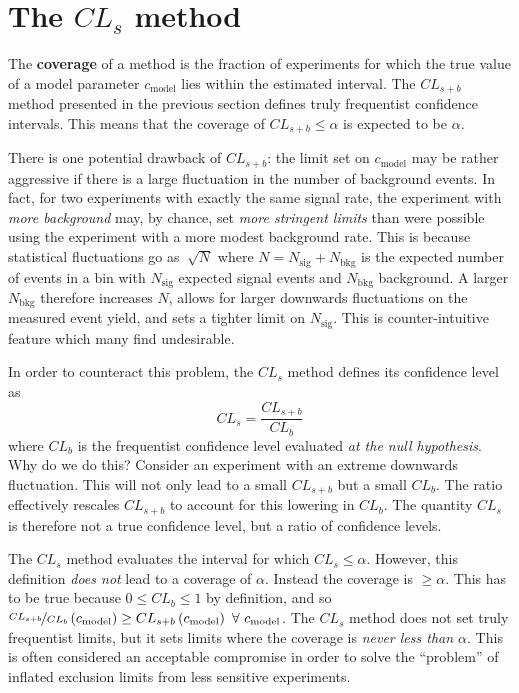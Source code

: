 \section{The $CL_s$ method}
\label{S. CLs}

The \textbf{coverage} of a method is the fraction of experiments for which the true value of a model parameter $c_\text{model}$ lies within the estimated interval. The $CL_{s+b}$ method presented in the previous section defines truly frequentist confidence intervals. This means that the coverage of $CL_{s+b}\leq\alpha$ is expected to be $\alpha$.

There is one potential drawback of $CL_{s+b}$: the limit set on $c_\text{model}$ may be rather aggressive if there is a large fluctuation in the number of background events. In fact, for two experiments with exactly the same signal rate, the experiment with \textit{more background} may, by chance, set \textit{more stringent limits} than were possible using the experiment with a more modest background rate. This is because statistical fluctuations go as $~\sqrt{N}$ where $N=N_\text{sig}+N_\text{bkg}$ is the expected number of events in a bin with $N_\text{sig}$ expected signal events and $N_\text{bkg}$ background. A larger $N_\text{bkg}$ therefore increases $N$, allows for larger downwards fluctuations on the measured event yield, and sets a tighter limit on $N_\text{sig}$. This is counter-intuitive feature which many find undesirable.

In order to counteract this problem, the $CL_s$ method defines its confidence level as
\begin{equation}
CL_s = \frac{CL_{s+b}}{CL_b}
\end{equation}
where $CL_b$ is the frequentist confidence level evaluated \textit{at the null hypothesis}. Why do we do this? Consider an experiment with an extreme downwards fluctuation. This will not only lead to a small $CL_{s+b}$ but a small $CL_b$. The ratio effectively rescales $CL_{s+b}$ to account for this lowering in $CL_b$. The quantity $CL_s$ is therefore not a true confidence level, but a ratio of confidence levels.

The $CL_s$ method evaluates the interval for which $CL_s\leq\alpha$. However, this definition \textit{does not} lead to a coverage of $\alpha$. Instead the coverage is $\geq\alpha$. This has to be true because $0\leq CL_b\leq 1$ by definition, and so $\nicefrac{CL_{s+b}}{CL_b}\left(c_\text{model}\right) \geq CL_{s+b}\left(c_\text{model}\right) ~\forall~ c_\text{model}$. The $CL_s$ method does not set truly frequentist limits, but it sets  limits where the coverage is \textit{never less than $\alpha$}. This is often considered an acceptable compromise in order to solve the ``problem'' of inflated exclusion limits from less sensitive experiments.
